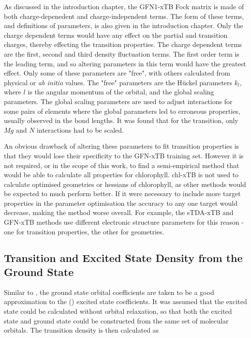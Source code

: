 As discussed in the introduction chapter, the GFN1-xTB Fock matrix is made of both
charge-depenedent and charge-independent terms. The form of these terms, and definitions
of parameters, is also given in the introduction chapter. Only the charge dependent terms would
have any effect on the partial and transition charges, thereby effecting the transition
properties. The charge dependent terms are the first, second and third density fluctuation
terms. The first order term is the leading term, and so altering parameters in this
term would have the greatest effect. Only some of these parameters are "free", 
with others calculated from physical or \emph{ab initio} values. The "free" parameters
are the H{\"u}ckel parameters $k_l$, where $l$ is the angular momentum of the orbital,
and the global scaling parameters. The global scaling parameters are used to adjust
interactions for some pairs of elements where the global parameters led to erroneous 
properties, usually observed in the bond lengths. It was found that for the \Qy
transition, only $Mg$ and $N$ interactions had to be scaled.

An obvious drawback of altering these parameters to fit transition properties is
that they would lose their specificity to the GFN-xTB training set. However it is
not required, or in the scope of this work, to find a semi-empirical method that 
would be able to calculate all properties for chlorophyll. chl-xTB is not used to 
calculate optimised geometries or hessians of chlorophyll, as other methods would 
be expected to much perform better. If it were necessary to include more target properties
in the parameter optimisation the accuracy to any one target would decrease, making
the method worse overall. For example, the sTDA-xTB and GFN-xTB methods use different
electronic structure parameters for this reason - one for transition properties, 
the other for geometries.

\subsection{Transition and Excited State Density from the Ground State}
\label{subsec:trans_excited_densities}

Similar to \dscf, the ground state orbital coefficients are taken to be a good approximation
to the (\Qy) excited state coefficients. It was assumed that the excited state could
be calculated without orbital relaxation, so that both the excited state and ground
state could be constructed from the same set of molecular orbitals. The transition
density is then calculated as

